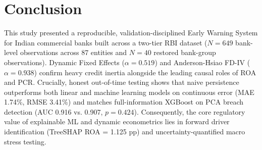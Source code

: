 \documentclass[conference]{IEEEtran}
\begin{document}
\section{Conclusion}
This study presented a reproducible, validation-disciplined Early Warning System for Indian commercial banks built across a two-tier RBI dataset ($N = 649$ bank-level observations across 87 entities and $N = 40$ restored bank-group observations). Dynamic Fixed Effects ($\alpha = 0.519$) and Anderson-Hsiao FD-IV ($\alpha = 0.938$) confirm heavy credit inertia alongside the leading causal roles of ROA and PCR. Crucially, honest out-of-time testing shows that naive persistence outperforms both linear and machine learning models on continuous error (MAE 1.74\%, RMSE 3.41\%) and matches full-information XGBoost on PCA breach detection (AUC 0.916 vs. 0.907, $p = 0.424$). Consequently, the core regulatory value of explainable ML and dynamic econometrics lies in forward driver identification (TreeSHAP ROA = 1.125 pp) and uncertainty-quantified macro stress testing.
\end{document}
